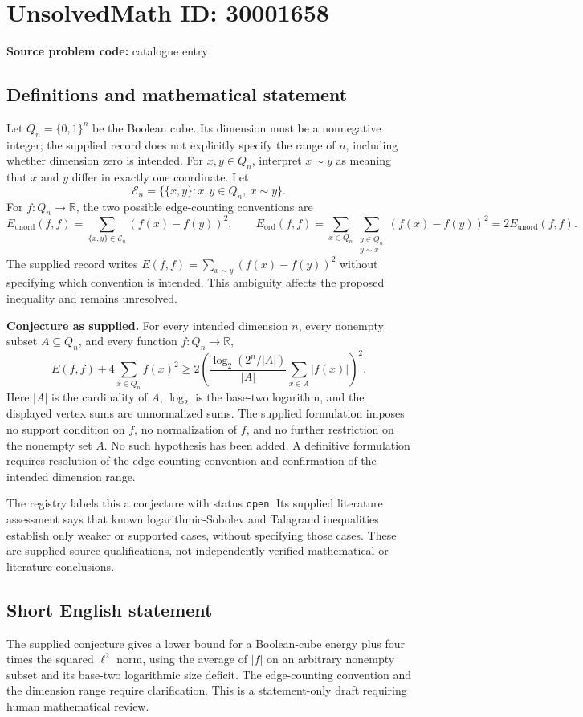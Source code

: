 \documentclass[11pt]{article}
\newcommand{\R}{\mathbb{R}}
\begin{document}
\section*{UnsolvedMath ID: 30001658}
\textbf{Source problem code:} catalogue entry
\subsection{Definitions and mathematical statement}
Let \(Q_n=\{0,1\}^n\) be the Boolean cube. Its dimension must be a nonnegative integer; the supplied record does not explicitly specify the range of \(n\), including whether dimension zero is intended. For \(x,y\in Q_n\), interpret \(x\sim y\) as meaning that \(x\) and \(y\) differ in exactly one coordinate. Let
\[
\mathcal E_n=\bigl\{\{x,y\}:x,y\in Q_n,\ x\sim y\bigr\}.
\]
For \(f:Q_n\to\R\), the two possible edge-counting conventions are
\[
E_{\mathrm{unord}}(f,f)=\sum_{\{x,y\}\in\mathcal E_n}(f(x)-f(y))^2,
\qquad
E_{\mathrm{ord}}(f,f)=\sum_{x\in Q_n}\sum_{\substack{y\in Q_n\\y\sim x}}(f(x)-f(y))^2
=2E_{\mathrm{unord}}(f,f).
\]
The supplied record writes \(E(f,f)=\sum_{x\sim y}(f(x)-f(y))^2\) without specifying which convention is intended. This ambiguity affects the proposed inequality and remains unresolved.

\textbf{Conjecture as supplied.} For every intended dimension \(n\), every nonempty subset \(A\subseteq Q_n\), and every function \(f:Q_n\to\R\),
\[
E(f,f)+4\sum_{x\in Q_n}f(x)^2
\geq
2\left(
\frac{\log_2(2^n/|A|)}{|A|}
\sum_{x\in A}|f(x)|
\right)^2.
\]
Here \(|A|\) is the cardinality of \(A\), \(\log_2\) is the base-two logarithm, and the displayed vertex sums are unnormalized sums. The supplied formulation imposes no support condition on \(f\), no normalization of \(f\), and no further restriction on the nonempty set \(A\). No such hypothesis has been added. A definitive formulation requires resolution of the edge-counting convention and confirmation of the intended dimension range.

The registry labels this a conjecture with status \texttt{open}. Its supplied literature assessment says that known logarithmic-Sobolev and Talagrand inequalities establish only weaker or supported cases, without specifying those cases. These are supplied source qualifications, not independently verified mathematical or literature conclusions.
\subsection{Short English statement}
The supplied conjecture gives a lower bound for a Boolean-cube energy plus four times the squared \(\ell^2\) norm, using the average of \(|f|\) on an arbitrary nonempty subset and its base-two logarithmic size deficit. The edge-counting convention and the dimension range require clarification. This is a statement-only draft requiring human mathematical review.
\end{document}
